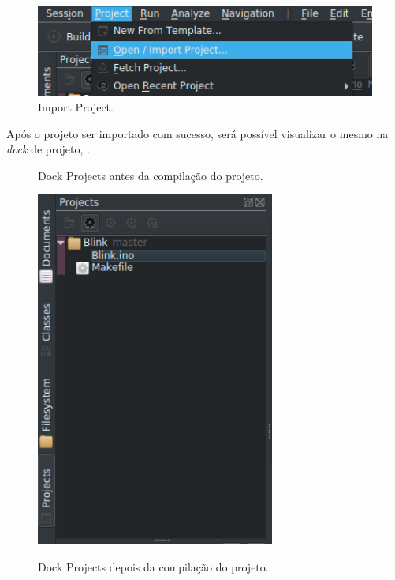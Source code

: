 \begin{figure}[!htb]
  \centering
  \caption[Import Project]{Import Project.}
  \label{fig:importproject}
  \includegraphics[width=1\textwidth]{figuras/importproject.png}
\end{figure}

Após o projeto ser importado com sucesso, será possível visualizar o mesmo na \textit{dock} de projeto, .

\begin{figure}[!htb]
  \centering
  \begin{minipage}{.5\textwidth}
  \centering
  \caption[Projects antes da compilação]{Dock Projects antes da compilação do projeto.}
  \label{fig:projects}
  \includegraphics[width=0.7\textwidth]{figuras/projects.png}
  \end{minipage}%
	\begin{minipage}{.5\textwidth}
  \centering
    \caption[Projects depois da compilação]{Dock Projects depois da compilação do projeto.}

\end{minipage}
\end{figure}
